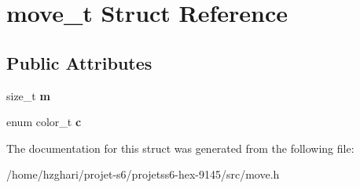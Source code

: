 \hypertarget{structmove__t}{}\section{move\+\_\+t Struct Reference}
\label{structmove__t}
\subsection*{Public Attributes}
\begin{DoxyCompactItemize}
\item 
\mbox{\label{structmove__t_ae3af52c333ddecbb34d29831c7a0ac50}} 
size\+\_\+t {\bfseries m}
\item 
\mbox{\label{structmove__t_a0b6b87357978fe6cf12b204afda189fd}} 
enum color\+\_\+t {\bfseries c}
\end{DoxyCompactItemize}


The documentation for this struct was generated from the following file\+:\begin{DoxyCompactItemize}
\item 
/home/hzghari/projet-\/s6/projetss6-\/hex-\/9145/src/move.\+h\end{DoxyCompactItemize}
